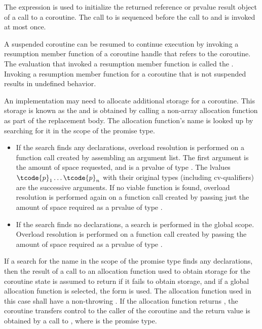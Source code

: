 \pnum
The expression  is used
to initialize
the returned reference or prvalue result object of a call to a coroutine.
The call to 
is sequenced before
the call to 
and is invoked at most once.

\pnum
A suspended coroutine can be resumed to continue execution by invoking
a resumption member function
of a coroutine handle
that refers to the coroutine.
The evaluation that invoked a resumption member function is
called the .
Invoking a resumption member function for a coroutine
that is not suspended results in undefined behavior.

\pnum
An implementation may need to allocate additional storage for a coroutine.
This storage is known as the  and is obtained by calling
a non-array allocation function
as part of the replacement body.
The allocation function's name is looked up by searching for it in the scope of the promise type.
\begin{itemize}
\item
If the search finds any declarations,
overload resolution is performed on a function call created by assembling an
argument list. The first argument is the amount of space requested, and
is a prvalue of type .
The lvalues $\tcode{p}_1 \dotsc \tcode{p}_n$
with their original types (including cv-qualifiers)
are the successive arguments.
If no viable function is found,
overload resolution is performed again
on a function call created by passing just
the amount of space required as a prvalue of type .
\item
If the search finds no declarations, a search is performed in the global scope.
Overload resolution is performed on a function call created by
passing the amount of space required as a prvalue of type .
\end{itemize}

\pnum
If a search for the name 
in the scope of the promise type finds
any declarations, then the result
of a call to an allocation function used to obtain storage for the coroutine
state is assumed to return  if it fails to obtain storage,
and if a global allocation function is selected,
the  form is used.
The allocation function used in this case shall have a non-throwing
.
If the allocation function returns , the coroutine transfers
control to the caller of the coroutine and the return value is obtained by a
call to , where 
is the promise type.

